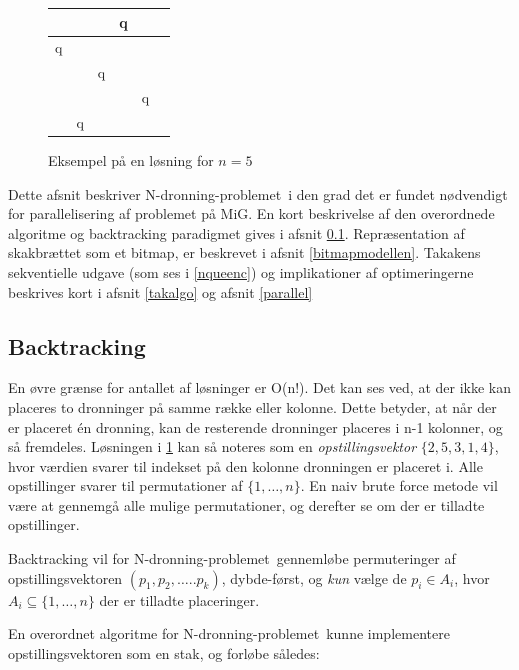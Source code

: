 \documentclass[final,a4paper,11pt]{article}
\newcommand{\mig}{MiG}
\newcommand{\nq}{N-dronning-problemet}
\def\chs#1{{\chessfont#1}}
\begin{document}
\begin{figure}
\begin{center}
\begin{tabular}{|c|c|c|c|c|c}
\hline	 &  & &   \chs{q} & \\
\hline	\chs{q} & &  &  & \\
\hline	 & & \chs{q} &  &  \\
\hline	 &  &  & & \chs{q} \\
\hline	 & \chs{q} & &  &  \\
\hline
\end{tabular}
\end{center}
\caption{Eksempel på en løsning for $n=5$}
\label{fig:nq5eks}
\end{figure}

Dette afsnit beskriver \nq\ i den grad det er fundet nødvendigt for parallelisering af problemet på \mig. En kort beskrivelse af den overordnede algoritme og backtracking paradigmet gives i afsnit \ref{backtracking}. Repræsentation af skakbrættet som et bitmap, er beskrevet i afsnit \ref{bitmapmodellen}. Takakens sekventielle udgave (som ses i \ref{nqueenc}) og implikationer af optimeringerne beskrives kort i afsnit \ref{takalgo} og afsnit \ref{parallel}


\subsection{Backtracking}\label{backtracking}

En øvre grænse for antallet af løsninger er O(n!). Det kan ses ved, at der ikke kan placeres to dronninger på samme række eller kolonne. Dette betyder, at når der er placeret én dronning, kan de resterende dronninger placeres i n-1 kolonner, og så fremdeles. Løsningen i \ref{fig:nq5eks} kan så noteres som en \emph{opstillingsvektor} $\{2,5,3,1,4\}$, hvor værdien svarer til indekset på den kolonne dronningen er placeret i. Alle opstillinger svarer til permutationer af $\{1,\ldots,n\}$. En naiv brute force metode vil være at gennemgå alle mulige permutationer, og derefter se om der er tilladte opstillinger.

Backtracking vil for \nq\ gennemløbe permuteringer af opstillingsvektoren  $(p_1,p_2,\ldots..p_k)$, dybde-først, og \emph{kun} vælge de $p_i \in A_i$, hvor $A_i\subseteq \{1,\ldots,n\}$ der er tilladte placeringer. 

En overordnet algoritme for \nq\ kunne implementere opstillingsvektoren som en stak, og forløbe således:
\end{document}
